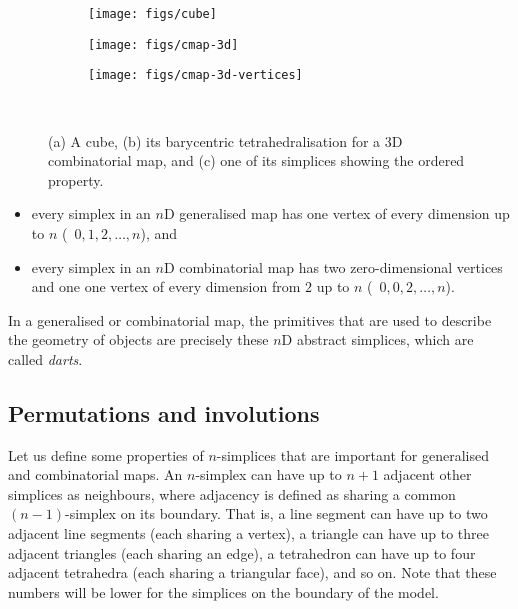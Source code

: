 \begin{figure}
\centering
\begin{subfigure}{0.33\linewidth}
\texttt{[image: figs/cube]}
\caption{}%
\label{subfig:cube}
\end{subfigure}%
\begin{subfigure}{0.33\linewidth}
\texttt{[image: figs/cmap-3d]}
\caption{}%
\label{subfig:cmap-3d}
\end{subfigure}%
\begin{subfigure}{0.33\linewidth}
\texttt{[image: figs/cmap-3d-vertices]}
\caption{}%
\label{subfig:cmap-3d-vertices}
\end{subfigure}\\
\caption{(a) A cube, (b) its barycentric tetrahedralisation for a 3D combinatorial map, and (c) one of its simplices showing the ordered property.}%
\label{fig:cmap-3d}
\end{figure}

\begin{itemize}
\item every simplex in an \(n\)D generalised map has one vertex of every dimension up to \(n\) (\ie\ \(0, 1, 2, \ldots, n\)), and
\item every simplex in an \(n\)D combinatorial map has two zero-dimensional vertices and one one vertex of every dimension from \(2\) up to \(n\) (\ie\ \(0, 0, 2, \ldots, n\)).
\end{itemize}

In a generalised or combinatorial map, the primitives that are used to describe the geometry of objects are precisely these \(n\)D abstract simplices, which are called \emph{darts}.

\subsection{Permutations and involutions}

Let us define some properties of \(n\)-simplices that are important for generalised and combinatorial maps.
An \(n\)-simplex can have up to \(n+1\) adjacent other simplices as neighbours, where adjacency is defined as sharing a common \((n-1)\)-simplex on its boundary.
That is, a line segment can have up to two adjacent line segments (each sharing a vertex), a triangle can have up to three adjacent triangles (each sharing an edge), a tetrahedron can have up to four adjacent tetrahedra (each sharing a triangular face), and so on.
Note that these numbers will be lower for the simplices on the boundary of the model.

